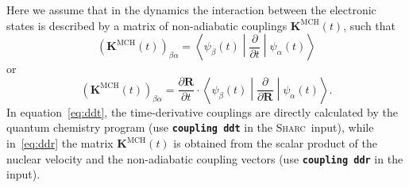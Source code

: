 \documentclass[a4paper,11pt,DIV=15,openany,twoside=false]{scrbook}
\newcommand{\sharc}{\textsc{Sharc}}
\newcommand{\ttt}[1]{\textbf{\texttt{#1}}}
\newcommand{\VEC}[1]{\ensuremath{\mathbf{#1}}}
\begin{document}
Here we assume that in the dynamics the interaction between the electronic states is described by a matrix of non-adiabatic couplings $\VEC{K}^{\text{MCH}}(t)$, such that
\begin{equation}
  \left(\VEC{K}^{\text{MCH}}(t)\right)_{\beta\alpha}
  =
  \left\langle
    \psi_\beta(t)
  \middle|
    \frac{\partial}{\partial t}
  \middle|
    \psi_\alpha(t)
  \right\rangle
  \label{eq:ddt}
\end{equation}
or
\begin{equation}
  \left(\VEC{K}^{\text{MCH}}(t)\right)_{\beta\alpha}
  =
  \frac{\partial \VEC{R}}{\partial t}\cdot
  \left\langle
    \psi_\beta(t)
  \middle|
    \frac{\partial}{\partial \VEC{R}}
  \middle|
    \psi_\alpha(t)
  \right\rangle.
  \label{eq:ddr}
\end{equation}
In equation~\eqref{eq:ddt}, the time-derivative couplings are directly calculated by the quantum chemistry program (use \ttt{coupling ddt} in the \sharc\ input), while in~\eqref{eq:ddr} the matrix $\VEC{K}^{\text{MCH}}(t)$ is obtained from the scalar product of the nuclear velocity and the non-adiabatic coupling vectors (use \ttt{coupling ddr} in the input).
\end{document}
